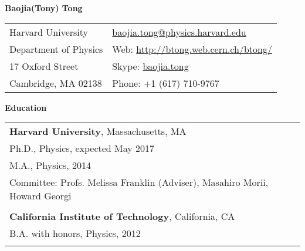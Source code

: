 \documentclass[letterpaper,11pt,oneside]{article}
\newcommand*{\Skype}{\href{skype:baojia.tong?add}{baojia.tong}}
\newcommand{\Absender}[1][\normalsize]{\Skype}
\newcommand{\blue}[1]{\textcolor[rgb]{0,0,0.9}{#1}}
\begin{document}

\noindent  \center \LARGE{\textbf{Baojia(Tony) Tong}}  \\
\vspace{1cm}
\normalsize
\begin{center}
\begin{tabular}{l l}
 Harvard University           & \hspace{1in} \href{mailto:baojia.tong@physics.harvard.edu}{baojia.tong@physics.harvard.edu} \\
 Department of Physics    & \hspace{1in} Web: \blue{\href{http://btong.web.cern.ch/btong/}{http://btong.web.cern.ch/btong/}}   \\
 17 Oxford Street              & \hspace{1in} Skype: \Absender  \\
 Cambridge, MA 02138     & \hspace{1in} Phone: +1 (617) 710-9767 \\
\end{tabular}
\end{center}
\noindent\makebox[\linewidth]{\rule{0.8\paperwidth}{1.5pt}}
\raggedright
\normalsize
\begin{flushleft}
\textbf{\Large{Education}} \\
\vspace{0.5cm}
 \begin{tabular}{@{} l}
     \textbf{Harvard University}, Massachusetts, MA \\
     Ph.D., Physics, expected May 2017 \\
     M.A., Physics, 2014 \\
     Committee: Profs. Melissa Franklin (Adviser), Masahiro Morii, Howard Georgi \\
     \\
     \textbf{California Institute of Technology}, California, CA \\
     B.A. with honors, Physics, 2012 \\
     \\
 \end{tabular}
\end{flushleft}
 
\end{document}
